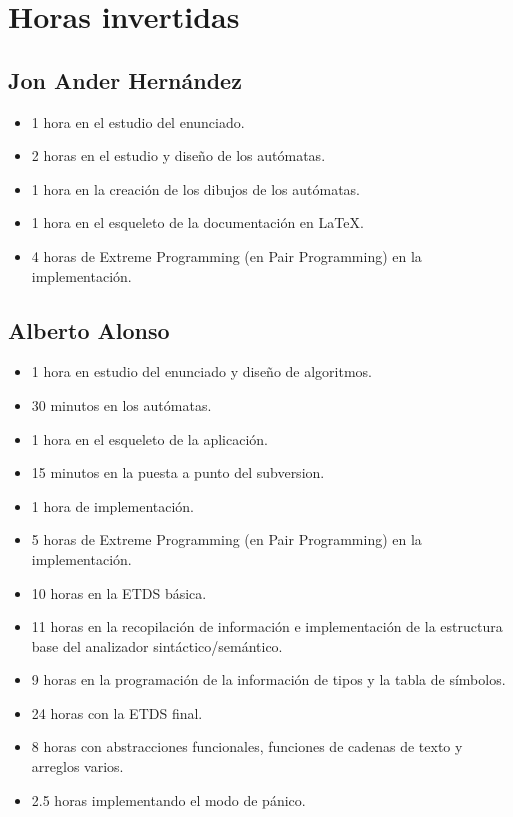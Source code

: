 
\chapter{Horas invertidas}

    \section{Jon Ander Hernández}
    
        \begin{itemize}
            \item 1 hora en el estudio del enunciado.
            \item 2 horas en el estudio y diseño de los autómatas.
            \item 1 hora en la creación de los dibujos de los autómatas.
            \item 1 hora en el esqueleto de la documentación en \LaTeX.
            \item 4 horas de Extreme Programming (en Pair Programming) en la implementación.
         \end{itemize}
    
    \section{Alberto Alonso}
    
        \begin{itemize}
            \item 1 hora en estudio del enunciado y diseño de algoritmos.
            \item 30 minutos en los autómatas.
            \item 1 hora en el esqueleto de la aplicación.
            \item 15 minutos en la puesta a punto del subversion.
            \item 1 hora de implementación.
            \item 5 horas de Extreme Programming (en Pair Programming) en la implementación.
			\item 10 horas en la ETDS básica.
			\item 11 horas en la recopilación de información e implementación de la estructura base del analizador sintáctico/semántico.
			\item 9 horas en la programación de la información de tipos y la tabla de símbolos.
			\item 24 horas con la ETDS final.
			\item 8 horas con abstracciones funcionales, funciones de cadenas de texto y arreglos varios.
			\item 2.5 horas implementando el modo de pánico.
        \end{itemize}
    

